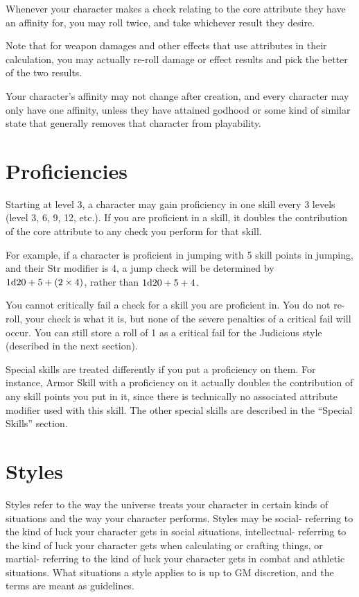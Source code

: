 Whenever your character makes a check relating to the core attribute they have an affinity for, you may roll twice, and take whichever result they desire.

Note that for weapon damages and other effects that use attributes in their calculation, you may actually re-roll damage or effect results and pick the better of the two results.

Your character’s affinity may not change after creation, and every character may only have one affinity, unless they have attained godhood or some kind of similar state that generally removes that character from playability.

\section{Proficiencies}
Starting at level 3, a character may gain proficiency in one skill every 3 levels (level 3, 6, 9, 12, etc.). If you are proficient in a skill, it doubles the contribution of the core attribute to any check you perform for that skill.

For example, if a character is proficient in jumping with 5 skill points in jumping, and their Str modifier is 4, a jump check will be determined by $1\mathrm{d}20 + 5 + (2\times4)$, rather than $1\mathrm{d}20 + 5 + 4$.

You cannot critically fail a check for a skill you are proficient in. You do not re-roll, your check is what it is, but none of the severe penalties of a critical fail will occur. You can still store a roll of 1 as a critical fail for the Judicious style (described in the next section).

Special skills are treated differently if you put a proficiency on them. For instance, Armor Skill with a proficiency on it actually doubles the contribution of any skill points you put in it, since there is technically no associated attribute modifier used with this skill. The other special skills are described in the ``Special Skills'' section.

\section{Styles}
Styles refer to the way the universe treats your character in certain kinds of situations and the way your character performs. Styles may be social- referring to the kind of luck your character gets in social situations, intellectual- referring to the kind of luck your character gets when calculating or crafting things, or martial- referring to the kind of luck your character gets in combat and athletic situations. What situations a style applies to is up to GM discretion, and the terms are meant as guidelines.

